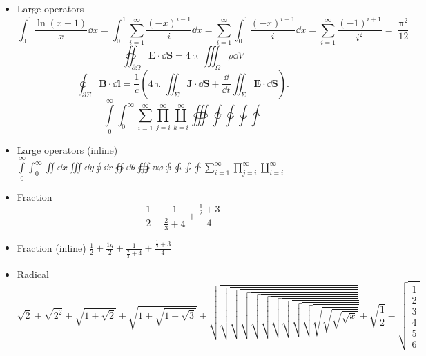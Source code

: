 \documentclass[11pt]{article}
\begin{document}
\begin{itemize}
  \item Large operators
  \[\int_0^1\frac{\ln (x+1)}{x}\dd{x}=\int_0^1\sum_{i=1}^{\infty}\frac{(-x)^{i-1}}{i}\dd{x}=\sum_{i=1}^{\infty}\int_0^1\frac{(-x)^{i-1}}{i}\dd{x}=\sum_{i=1}^{\infty}\frac{(-1)^{i+1}}{i^2}=\frac{\uppi^2}{12}\]
  		\[\oiint_{\partial\Omega}\symbf{E}\cdot\dd{\symbf S}=4\uppi \iiint_{\Omega}\rho\dd{V}\]
  		\[\oint_{\partial\Sigma}\symbf B\cdot \dd{\symbf{l}}=\frac{1}{c}\left(4\uppi\iint_{\Sigma}\symbf J\cdot \dd{\symbf S}+\frac{\dd}{\dd t}\iint_{\Sigma}\symbf E \cdot \dd{\symbf{S}}\right).\]
        \[
          \int\limits_0^\infty \int_0^\infty
          \sum_{i=1}^\infty \prod_{j=i}^\infty \coprod_{k=i}^\infty
          \oiiint \varointclockwise \ointctrclockwise \awint \intclockwise
        \]

  \item Large operators (inline)
        $ \int\limits_0^\infty \int_0^\infty \iint \dd{x} \iiint \dd{y}
          \oint \dd{r} \oiint \dd{\theta} \oiiint \dd{\varphi}\varointclockwise \ointctrclockwise \awint \intclockwise
          \sum_{i=1}^\infty \prod_{j=i}^\infty \coprod_{i=i}^\infty $

  \item Fraction
        \[ \frac{1}{2} + \frac{1}{\frac{2}{3}+4} + \frac{\frac{1}{2}+3}{4} \]

  \item Fraction (inline)
        $ \frac{1}{2} + \frac{1g}{2} + \frac{1}{\frac{2}{3}+4} + \frac{\frac{1}{2}+3}{4} $

  \item Radical
        \[
            \sqrt{2} + \sqrt{2^2} + \sqrt{1+\sqrt{2}} + \sqrt{1+\sqrt{1+\sqrt{3}}}
          + \sqrt{\sqrt{\sqrt{\sqrt{\sqrt{\sqrt{\sqrt{\sqrt{\sqrt{\sqrt{\sqrt{\sqrt{\sqrt{\sqrt{x}}}}}}}}}}}}}} + \sqrt{\frac{1}{2}}-\sqrt{\begin{matrix}
          	1\\2\\3\\4\\5\\6
          	\end{matrix}}
        \]


\end{itemize}
\end{document}
